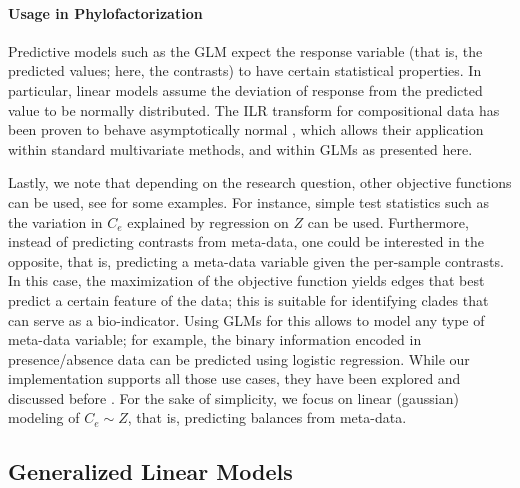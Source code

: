 \paragraph{Usage in Phylofactorization}
\label{ch:Factorization:sec:Methods:sub:ObjectiveFunction:par:Usage}

Predictive models such as the \ac{GLM} expect the response variable (that is, the predicted values; here, the contrasts)
to have certain statistical properties.
In particular, linear models assume the deviation of response from the predicted value to be normally distributed.
The ILR transform for compositional data has been proven to behave asymptotically normal \cite{Egozcue2003,Pawlowsky-Glahn2011a},
which allows their application within standard multivariate methods,
and within \acp{GLM} as presented here.

Lastly, we note that depending on the research question, other objective functions can be used,
see \cite{Washburne2017a,Washburne2018} for some examples.
For instance, simple test statistics such as the variation in $C_e$ explained by regression on $Z$ can be used.
Furthermore, instead of predicting contrasts from meta-data, one could be interested in the opposite,
that is, predicting a meta-data variable given the per-sample contrasts.
In this case, the maximization of the objective function yields edges that best predict a certain feature of the data;
this is suitable for identifying clades that can serve as a bio-indicator.
Using \acp{GLM} for this allows to model any type of meta-data variable;
for example, the binary information encoded in presence/absence data can be predicted using logistic regression.
While our implementation supports all those use cases,
they have been explored and discussed before \cite{Washburne2017a,Washburne2019}.
For the sake of simplicity, we focus on linear (gaussian) modeling of $C_e \sim Z$,
that is, predicting balances from meta-data.


\subsection{Generalized Linear Models}
\label{ch:Factorization:sec:Methods:sub:GLMs}

